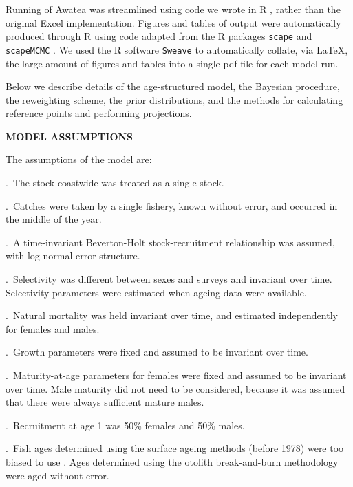 \documentclass[11pt]{article}   %
\newcommand{\inarea}{coastwide}
\begin{document}

Running of Awatea was streamlined using code we wrote in R \citep{R2013}, rather than the original Excel implementation. Figures and tables of output were automatically produced through R using code adapted from the R packages {\tt scape} \citep{magn09} and {\tt scapeMCMC} \citep{ms07}. We used the R software {\tt Sweave} \citep{leis02} to automatically collate, via \LaTeX, the large amount of figures and tables into a single pdf file for each model run.

Below we describe details of the age-structured model, the Bayesian procedure, the reweighting scheme, the prior distributions, and the methods for calculating reference points and performing projections.



{\bf MODEL ASSUMPTIONS}

The assumptions of the model are:

.~The stock \inarea{} was treated as a single stock.

.~Catches were taken by a single fishery, known without error, and occurred in the middle of the year.

.~A time-invariant Beverton-Holt stock-recruitment relationship was assumed, with log-normal error structure.

.~Selectivity was different between sexes and surveys and invariant over time. Selectivity parameters were estimated when ageing data were available.

.~Natural mortality was held invariant over time, and estimated independently for females and males.

.~Growth parameters were fixed and assumed to be invariant over time.

.~Maturity-at-age parameters for females were fixed and assumed to be invariant over time. Male maturity did not need to be considered, because it was assumed that there were always sufficient mature males.

.~Recruitment at age 1 was 50\% females and 50\% males.

.~Fish ages determined using the surface ageing methods (before 1978) were too biased to use \citep{beam79}. Ages determined using the otolith break-and-burn methodology \citep{macl97} were aged without error. 
\end{document}
